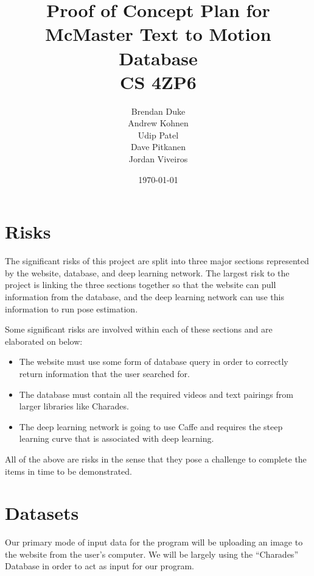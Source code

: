 \documentclass[a4paper, 12pt]{article}
\date{\today}
\title{Proof of Concept Plan for McMaster Text to Motion Database \\CS 4ZP6}
\author{Brendan Duke\\
        Andrew Kohnen\\
        Udip Patel\\
        Dave Pitkanen\\
        Jordan Viveiros}
\begin{document}
\maketitle

\section{Risks}

The significant risks of this project are split into three major sections
represented by the website, database, and deep learning network. The largest
risk to the project is linking the three sections together so that the website
can pull information from the database, and the deep learning network can use
this information to run pose estimation.

Some significant risks are involved within each of these sections and are
elaborated on below:

\begin{itemize}
    \item The website must use some form of database query in order to
            correctly return information that the user searched for.
    \item The database must contain all the required videos and text pairings
            from larger libraries like Charades.
    \item The deep learning network is going to use Caffe and requires the
            steep learning curve that is associated with deep learning.
\end{itemize}

All of the above are risks in the sense that they pose a challenge to complete
the items in time to be demonstrated.

\section{Datasets}
{Our primary mode of input data for the program will be uploading an image to
the website from the user's computer. We will be largely using the ``Charades''
Database in order to act as input for our program.}
\end{document}
